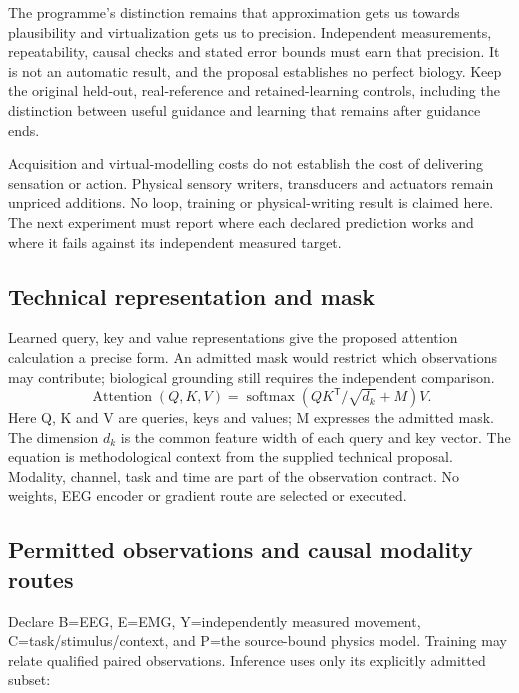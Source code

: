 The programme's distinction remains that approximation gets us towards plausibility and virtualization gets us to precision. Independent measurements, repeatability, causal checks and stated error bounds must earn that precision. It is not an automatic result, and the proposal establishes no perfect biology. Keep the original held-out, real-reference and retained-learning controls, including the distinction between useful guidance and learning that remains after guidance ends.

Acquisition and virtual-modelling costs do not establish the cost of delivering
sensation or action. Physical sensory writers, transducers and actuators remain
unpriced additions. No loop, training or
physical-writing result is claimed here. The next experiment must report where
each declared prediction works and where it fails against its independent
measured target.

\subsection{Technical representation and mask}
Learned query, key and value representations give the proposed attention
calculation a precise form. An admitted mask would restrict which observations
may contribute; biological grounding still requires the independent comparison.
\[\operatorname{Attention}(Q,K,V)=\operatorname{softmax}\!\left(QK^{\mathsf{T}}/\sqrt{d_k}+M\right)V.\]
Here Q, K and V are queries, keys and values; M expresses the admitted mask. The dimension $d_k$ is the common feature width of each query and key vector. The equation is methodological context from the supplied technical proposal. Modality, channel, task and time are part of the observation contract. No weights, EEG encoder or gradient route are selected or executed.

\subsection{Permitted observations and causal modality routes}
Declare B=EEG, E=EMG, Y=independently measured movement, C=task/\allowbreak{}stimulus/\allowbreak{}context, and P=the source-bound physics model. Training may relate qualified paired observations. Inference uses only its explicitly admitted subset:

